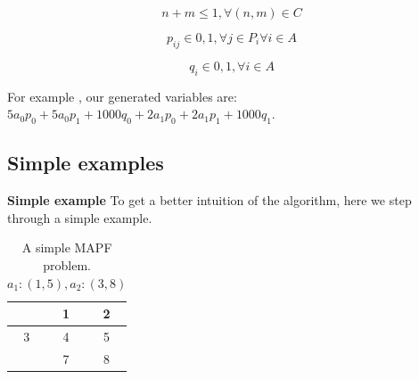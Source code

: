 \documentclass[a4paper,11pt]{article}
\begin{document}
\begin{equation} \label{mas:constraint} %
n + m \le 1, \forall (n,m) \in C
\end{equation}

\begin{equation} \label{mas:path-one-or-zero} %
p_{ij} \in {0, 1}, \forall j \in P_i \forall i \in A
\end{equation}

\begin{equation} \label{mas:penalty} %
q_{i} \in {0, 1}, \forall i \in A
\end{equation}

For example \cite{put example!}, our generated variables are: $5a_0p_0 + 5a_0p_1 + 1000q_0 + 2a_1p_0 + 2a_1p_1 + 1000q_1$.


\subsection{Simple examples}
\noindent \textbf{Simple example} To get a better intuition of the algorithm, here we step through a simple example.

\begin{table}[h]
	\centering
	\footnotesize
	\begin{tabular}{|c|c|c|}
		\hline
		\cellcolor{black}  & 1 & 2\\ \hline
		3 & 4 & 5 \\ \hline
		\cellcolor{black} & 7 & 8 \\ \hline
	\end{tabular}
	
	\caption{A simple MAPF problem. $a_1: (1, 5), a_2: (3, 8)$}
	\label{fig:simple-step-through-example}
\end{table}
\end{document}
